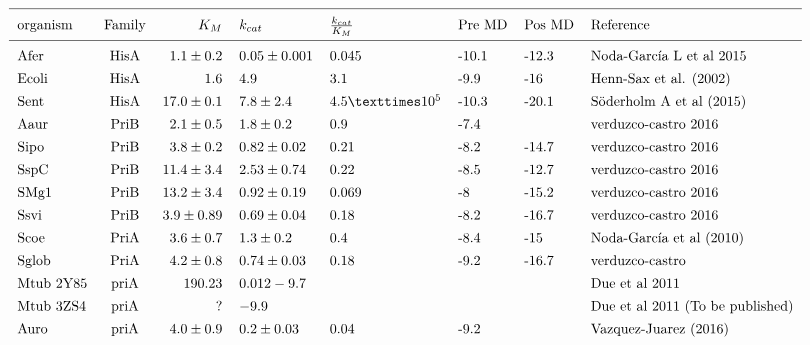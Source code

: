 \documentclass[12pt,twoside]{reedthesis}
\begin{document}
  \[ 
  \begin{tabular}{ l c r l l l l l}
  \hline \\ [-1.5ex]
  organism  &Family & $K_M    $     & $k_{cat}$        & $\frac{k_{cat}}{K_M}$ &Pre MD & Pos MD & Reference  \\ [1ex]
  \hline \\ [-1.5ex]
  Afer        &HisA   & $1.1\pm0.2$   &$  0.05\pm0.001    $& 0.045                  &-10.1    &-12.3       &Noda-García L et al 2015\\ [1ex]
  Ecoli       &HisA   &$  1.6         $&$         4.9       $&3.1                   &-9.9   &-16       &Henn-Sax et al. (2002)\\ [1ex]
  Sent        &HisA   &$  17.0 \pm0.1 $&$ 7.8 \pm 2.4   $&$4.5 × 10^5          $&-10.3  &-20.1     &Söderholm A et al (2015)\\ [1ex]
  Aaur        &PriB   &$  2.1 \pm 0.5 $& $    1.8 \pm 0.2     $&0.9                   &-7.4   &              &verduzco-castro 2016\\ [1ex]
  Sipo        &PriB   &$  3.8\pm0.2     $&$0.82\pm0.02        $&0.21                  &-8.2     &-14.7       &verduzco-castro 2016\\ [1ex]
  SspC        &PriB   &$  11.4\pm3.4  $&$2.53\pm0.74      $&0.22                  &   -8.5    &-12.7     &verduzco-castro 2016\\ [1ex]
  SMg1        &PriB   &$  13.2\pm3.4  $&$0.92\pm0.19      $&0.069                 &-8     &-15.2     &verduzco-castro 2016\\ [1ex]
  Ssvi        &PriB   &$  3.9\pm0.89  $&$0.69\pm0.04      $&0.18                  &-8.2     &-16.7     &verduzco-castro 2016\\ [1ex]
  Scoe        &PriA   &$  3.6\pm0.7     $&$ 1.3\pm0.2     $  &0.4                   &-8.4   &-15       &Noda-García et al (2010)\\ [1ex]
  Sglob       &PriA   & $4.2\pm0.8     $ & $0.74\pm0.03    $   &0.18                  &-9.2     &-16.7       &verduzco-castro\\ [1ex]
  Mtub 2Y85   &priA   &$  19  0.23      $&$0.012  -9.7          $&                      &       &          &Due et al 2011\\ [1ex]
  Mtub 3ZS4   &priA   &$  ?                 $&$-9.9               $&                      &       &          &Due et al 2011 (To be published)\\ [1ex]
  Auro        &priA   &$  4.0 \pm 0.9 $&$0.2 \pm 0.03   $&0.04                    &-9.2       &          &Vazquez-Juarez (2016)\\ [1ex]

\end{tabular}\]
\end{document}
